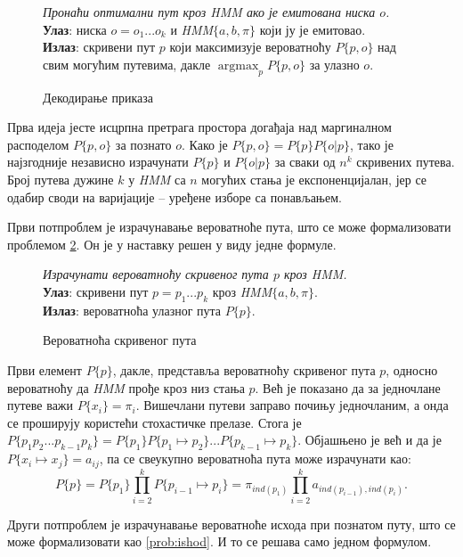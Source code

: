 \documentclass[12pt,oneside]{memoir}
\newenvironment{problem}[1][!ht]
{\renewcommand{\algorithmcfname}{Проблем}
\begin{figure}[!ht]
\centering
  \begin{minipage}{.94\linewidth}
	\begin{algorithm}[#1]%
  }{\end{algorithm}
  \end{minipage}
\end{figure}}
\begin{document}
\begin{CJK}{UTF8}{ipxm}
\begin{problem}[H]
  \SetAlgoLined
  \textit{Пронаћи оптимални пут кроз \textit{HMM} ако је емитована ниска $o$.}\\
  \textbf{Улаз}: ниска $o = o_1...o_k$ и \textit{HMM}$\{a, b, \pi\}$ који ју је емитовао.\\
  \textbf{Излаз}: скривени пут $p$ који максимизује вероватноћу $P\{p, o\}$ над свим могућим путевима, дакле $\operatorname*{argmax}_p P\{p, o\}$ за улазно $o$.
  \caption{Декодирање приказа}
  \label{prob:dekod}
\end{problem}

Прва идеја јесте исцрпна претрага простора догађаја над маргиналном расподелом $P\{p, o\}$ за познато $o$. Како је $P\{p, o\} = P\{p\} P\{o | p\}$, тако је најзгодније независно израчунати $P\{p\}$ и $P\{o | p\}$ за сваки од $n^k$ скривених путева. Број путева дужине $k$ у \textit{HMM} са $n$ могућих стања је експоненцијалан, јер се одабир своди на варијације -- уређене изборе са понављањем.

Први потпроблем је израчунавање вероватноће пута, што се може формализовати проблемом \ref{prob:put}. Он је у наставку решен у виду једне формуле.

\begin{problem}[H]
  \SetAlgoLined
  \textit{Израчунати вероватноћу скривеног пута $p$ кроз \textit{HMM}.}\\
  \textbf{Улаз}: скривени пут $p = p_1...p_k$ кроз \textit{HMM}$\{a, b, \pi\}$.\\
  \textbf{Излаз}: вероватноћа улазног пута $P\{p\}$.
  \caption{Вероватноћа скривеног пута\cite{ba10a}}
  \label{prob:put}
\end{problem}

Први елемент $P\{p\}$, дакле, представља вероватноћу скривеног пута $p$, односно вероватноћу да \textit{HMM} прође кроз низ стања $p$. Већ је показано да за једночлане путеве важи $P\{x_i\} = \pi_i$. Вишечлани путеви заправо почињу једночланим, а онда се проширују користећи стохастичке прелазе. Стога је $P\{p_1p_2...p_{k-1}p_k\} = P\{p_1\}P\{p_1 \mapsto p_2\}...P\{p_{k-1} \mapsto p_k\}$. Објашњено је већ и да је $P\{x_i \mapsto x_j\} = a_{ij}$, па се свеукупно вероватноћа пута може израчунати као: $$P\{p\} = P\{p_1\} \prod_{i=2}^k P\{p_{i-1} \mapsto p_i\} = \pi_{ind(p_1)} \prod_{i=2}^k a_{ind(p_{i-1}), ind(p_i)}.$$

Други потпроблем је израчунавање вероватноће исхода при познатом путу, што се може формализовати као \ref{prob:ishod}. И то се решава само једном формулом.


\end{CJK}
\end{document}
